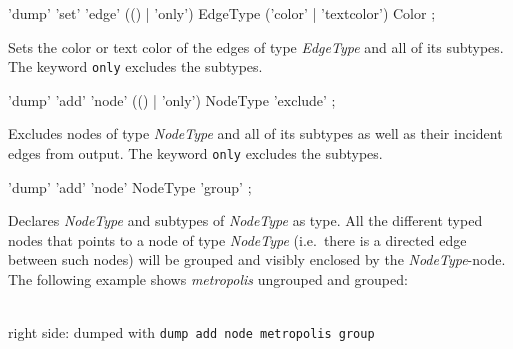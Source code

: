 \begin{rail}
  'dump' 'set' 'edge' (() | 'only') EdgeType ('color' | 'textcolor') Color ;
\end{rail}
Sets the color or text color of the edges of type \emph{EdgeType} and all of its subtypes. The keyword \texttt{only} excludes the subtypes.

\begin{rail}
  'dump' 'add' 'node' (() | 'only') NodeType 'exclude' ;
\end{rail}
Excludes nodes of type \emph{NodeType} and all of its subtypes as well as their incident edges from output. The keyword \texttt{only} excludes the subtypes.

\begin{rail}
  'dump' 'add' 'node' NodeType 'group' ;
\end{rail}
Declares \emph{NodeType} and subtypes of \emph{NodeType} as  type. All the different typed nodes that points to a node of type \emph{NodeType} (i.e.\ there is a directed edge between such nodes) will be grouped and visibly enclosed by the \emph{NodeType}-node.
The following example shows \emph{metropolis} ungrouped and grouped:
\begin{center}
    \hfill {}\\
  {\small right side: dumped with \texttt{dump add node metropolis group}}
\end{center}

